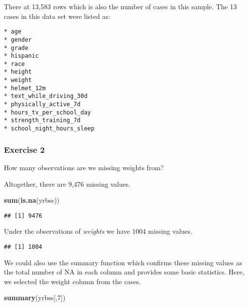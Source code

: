 \documentclass[
]{article}
\newenvironment{Shaded}{\begin{snugshade}}{\end{snugshade}}
\newcommand{\DecValTok}[1]{\textcolor[rgb]{0.00,0.00,0.81}{#1}}
\newcommand{\KeywordTok}[1]{\textcolor[rgb]{0.13,0.29,0.53}{\textbf{#1}}}
\newcommand{\NormalTok}[1]{#1}
\newcommand{\OperatorTok}[1]{\textcolor[rgb]{0.81,0.36,0.00}{\textbf{#1}}}
\begin{document}
There at 13,583 rows which is also the number of cases in this sample.
The 13 cases in this data set were listed as:

\begin{verbatim}
* age
* gender
* grade
* hispanic
* race
* height
* weight
* helmet_12m
* text_while_driving_30d
* physically_active_7d 
* hours_tv_per_school_day
* strength_training_7d
* school_night_hours_sleep 
\end{verbatim}

\hypertarget{exercise-2}{%
\subsubsection{Exercise 2}\label{exercise-2}}

How many observations are we missing weights from?

Altogether, there are 9,476 missing values.

\begin{Shaded}
\begin{Highlighting}[]
\KeywordTok{sum}\NormalTok{(}\KeywordTok{is.na}\NormalTok{(yrbss))}
\end{Highlighting}
\end{Shaded}

\begin{verbatim}
## [1] 9476
\end{verbatim}

Under the observations of \emph{weights} we have 1004 missing values.

\begin{Shaded}
\end{Shaded}

\begin{verbatim}
## [1] 1004
\end{verbatim}

We could also use the summary function which confirms these missing
values as the total number of NA in each column and provides some basic
statistics. Here, we selected the weight column from the cases.

\begin{Shaded}
\begin{Highlighting}[]
\KeywordTok{summary}\NormalTok{(yrbss[,}\DecValTok{7}\NormalTok{])}
\end{Highlighting}
\end{Shaded}
\end{document}
